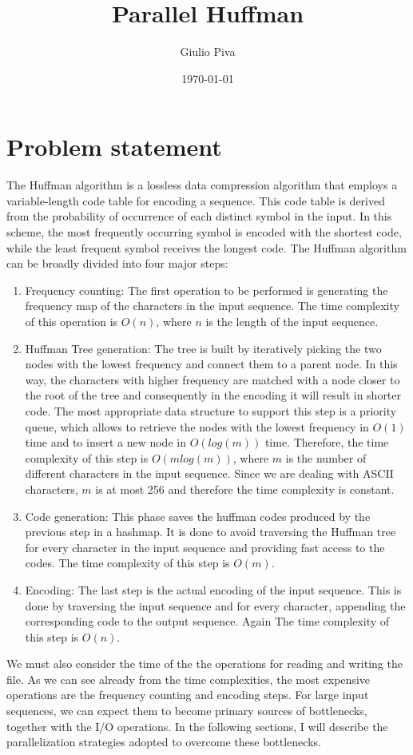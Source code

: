 \documentclass{article}
\title{Parallel Huffman}
\author{Giulio Piva}
\date{\today}
\begin{document}
\maketitle

\tableofcontents
\break
\section{Problem statement}
The Huffman algorithm is a lossless data compression algorithm that employs a variable-length
code table for encoding a sequence. This code table is derived from the probability of
occurrence of each distinct symbol in the input. In this scheme, the most frequently
occurring symbol is encoded with the shortest code, while the least frequent symbol receives the
longest code. The Huffman algorithm can be broadly divided into four major steps:
\begin{enumerate}
    \item Frequency counting: The first operation to be performed is generating the frequency map of the characters in the input sequence.
          The time complexity of this operation is $O(n)$, where $n$ is the length of the input sequence.
    \item Huffman Tree generation: The tree is built by iteratively picking the two nodes with the lowest frequency and connect them to a parent node.
          In this way, the characters with higher frequency are matched with a node closer to the root of the tree and consequently
          in the encoding it will result in shorter code. The most appropriate data structure to
          support this step is a priority queue, which allows to retrieve the nodes with the lowest
          frequency in $O(1)$ time and to insert a new node in $O(log(m))$ time.
          Therefore, the time complexity of this step is $O(mlog(m))$, where $m$ is the number of different characters in the input sequence. Since
          we are dealing with ASCII characters, $m$ is at most 256 and therefore the time complexity is constant.
    \item Code generation: This phase saves the huffman codes produced by the previous step in a hashmap. It
          is done to avoid traversing the Huffman tree for every character in the input sequence and providing fast access to the codes.
          The time complexity of this step is $O(m)$.
    \item Encoding: The last step is the actual encoding of the input sequence. This is done by traversing the input sequence and
          for every character, appending the corresponding code to the output sequence. Again The time complexity of this step is $O(n)$.
\end{enumerate}
We must also consider the time of the the operations for reading and writing the file.
As we can see already from the time complexities, the most expensive operations are the frequency counting and encoding steps.
For large input sequences, we can expect them to become primary sources of bottlenecks, together with the I/O operations.
In the following sections, I will describe the parallelization strategies adopted to overcome these bottlenecks.
\end{document}
